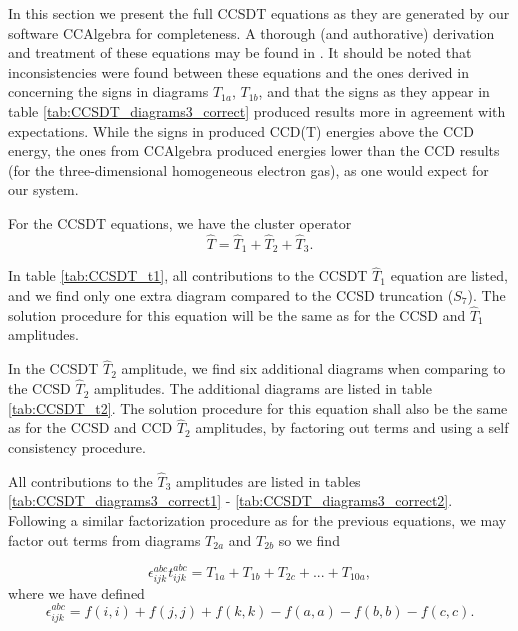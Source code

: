In this section we present the full CCSDT equations as they are
generated by our software CCAlgebra for completeness. A thorough (and authorative)
derivation and treatment of these equations may be found in
\cite{ShavittBartlett2009}. It should be noted that inconsistencies
were found between these equations and the ones derived in
\cite{ShavittBartlett2009} concerning the signs in diagrams $T_{1a}$,
$T_{1b}$, and that the signs as they appear in table
\ref{tab:CCSDT_diagrams3_correct} produced results more in agreement
with expectations. While the signs in \cite{ShavittBartlett2009}
produced CCD(T) energies above the CCD energy, the ones from CCAlgebra
produced energies lower than the CCD results (for the three-dimensional homogeneous electron gas),
as one would expect for our system.

For the CCSDT equations, we have the cluster operator
\begin{equation}
\hat{T} = \hat{T}_1 + \hat{T}_2 + \hat{T}_3.
\end{equation}

In table \ref{tab:CCSDT_t1}, all contributions to the CCSDT $\hat{T}_1$ equation are listed, and we find only one extra diagram compared to the CCSD truncation ($S_7$). The solution procedure for this equation will be the same as for the CCSD and $\hat{T}_1$ amplitudes.

In the CCSDT $\hat{T}_2$ amplitude, we find six additional diagrams when
comparing to the CCSD $\hat{T}_2$ amplitudes. The additional diagrams are
listed in table \ref{tab:CCSDT_t2}. The solution procedure for this
equation shall also be the same as for the CCSD and CCD $\hat{T}_2$ amplitudes,
by factoring out terms and using a self consistency procedure.

All contributions to the $\hat{T}_3$ amplitudes are listed in tables
\ref{tab:CCSDT_diagrams3_correct1} -
\ref{tab:CCSDT_diagrams3_correct2}. Following a similar factorization
procedure as for the previous equations, we may factor out terms from
diagrams $T_{2a}$ and $T_{2b}$ so we find

\begin{equation}
\epsilon^{abc}_{ijk} t^{abc}_{ijk} = T_{1a} + T_{1b} + T_{2c} + ... + T_{10a},
\label{eqn:t3_factor}
\end{equation}
where we have defined
\begin{equation}
\epsilon^{abc}_{ijk} = f(i,i) + f(j,j) + f(k,k) - f(a,a) - f(b,b) - f(c,c).
\label{eqn:t3_factor}
\end{equation}

